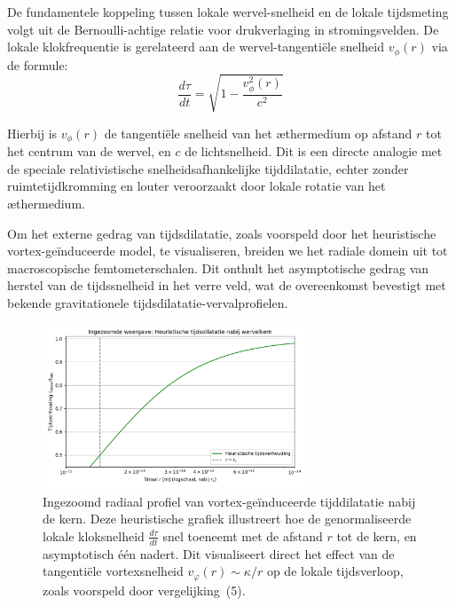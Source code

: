 De fundamentele koppeling tussen lokale wervel-snelheid en de lokale tijdsmeting volgt uit de Bernoulli-achtige relatie voor drukverlaging in stromingsvelden. De lokale klokfrequentie is gerelateerd aan de wervel-tangentiële snelheid $v_{\phi}(r)$ via de formule:
\begin{equation}\label{eq:vortex_tijddilatatie}
    \frac{d\tau}{dt} = \sqrt{1 - \frac{v_{\phi}^2(r)}{c^2}}
\end{equation}

Hierbij is $v_{\phi}(r)$ de tangentiële snelheid van het æthermedium op afstand $r$ tot het centrum van de wervel, en $c$ de lichtsnelheid. Dit is een directe analogie met de speciale relativistische snelheidsafhankelijke tijddilatatie, echter zonder ruimtetijdkromming en louter veroorzaakt door lokale rotatie van het æthermedium.

Om het externe gedrag van tijdsdilatatie, zoals voorspeld door het heuristische vortex-geïnduceerde model, te visualiseren, breiden we het radiale domein uit tot macroscopische femtometerschalen. Dit onthult het asymptotische gedrag van herstel van de tijdssnelheid in het verre veld, wat de overeenkomst bevestigt met bekende gravitationele tijdsdilatatie-vervalprofielen.

\begin{figure}[H]
    \centering
    \includegraphics[width=0.7\textwidth]{06-HeuristicTimeDilation4_nl}
    \caption{
        Ingezoomd radiaal profiel van vortex-geïnduceerde tijddilatatie nabij de kern.
        Deze heuristische grafiek illustreert hoe de genormaliseerde lokale kloksnelheid
        $\frac{d\tau}{dt}$ snel toeneemt met de afstand $r$ tot de kern,
        en asymptotisch één nadert. Dit visualiseert direct het effect van
        de tangentiële vortexsnelheid $v_\varphi(r) \sim \kappa / r$ op de lokale tijdsverloop,
        zoals voorspeld door vergelijking~(5).
    }
    \label{fig:HeuristicTimeDilation}
\end{figure}

